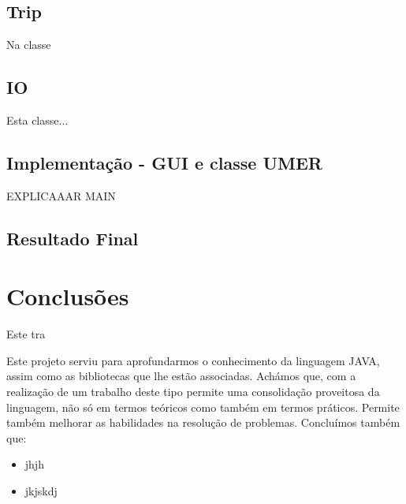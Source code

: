 \documentclass[a4paper]{article}
\begin{document}
\subsection{Trip}
Na classe

\subsection{IO}
Esta classe...

\subsection{Implementação - GUI e classe UMER}
EXPLICAAAR MAIN

\pagebreak
\subsection{Resultado Final}

\section{Conclusões}
\label{sec:conclusao}
Este tra

Este projeto serviu para aprofundarmos o conhecimento da linguagem JAVA, assim como as bibliotecas que lhe estão associadas. Achámos que, com a realização de um trabalho deste tipo permite uma consolidação proveitosa da linguagem, não só em termos teóricos como também em termos práticos. Permite também melhorar as habilidades na resolução de problemas. Concluímos também que:

\begin{itemize}
        \item jhjh
 	    \item jkjskdj
\end{itemize}
\end{document}

